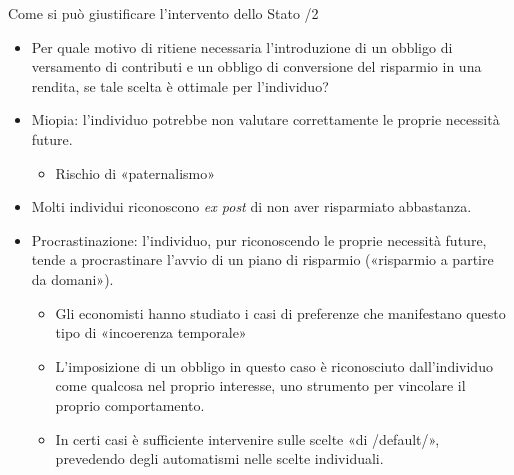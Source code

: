 \documentclass[11pt]{beamer}
\begin{document}
\begin{frame}{Come si può giustificare l'intervento dello Stato /2}
\begin{itemize}
\item Per quale motivo di ritiene necessaria l'introduzione di un obbligo di
versamento di contributi e un obbligo di conversione del risparmio in una
rendita, se tale scelta è ottimale per l'individuo?
\item \alert{Miopia}: l'individuo potrebbe non valutare correttamente le proprie
necessità future.
\begin{itemize}
\item Rischio di «paternalismo»
\end{itemize}
\item Molti individui riconoscono \emph{ex post} di non aver risparmiato abbastanza.
\item \alert{Procrastinazione}: l'individuo, pur riconoscendo le proprie necessità
future, tende a procrastinare l'avvio di un piano di risparmio («risparmio a
partire da domani»).
\begin{itemize}
\item Gli economisti hanno studiato i casi di preferenze che manifestano questo
tipo di «incoerenza temporale»
\item L'imposizione di un obbligo in questo caso è riconosciuto dall'individuo
come qualcosa nel proprio interesse, uno strumento per vincolare il
proprio comportamento.
\item In certi casi è sufficiente intervenire sulle scelte «di /default/»,
prevedendo degli automatismi nelle scelte individuali.
\end{itemize}
\end{itemize}
\end{frame}
\end{document}
